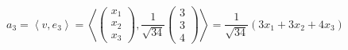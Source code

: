 \begin{ejercicio}
\begin{enumerate}
        \begin{equation*}
            a_3 = \left\langle 
                v, e_3\right\rangle
                = \left\langle 
                \left(\begin{array}{c}
                     x_1 \\ x_2 \\ x_3
                \end{array}\right),
                \frac{1}{\sqrt{34}}
                \left(\begin{array}{c}
                     3 \\ 3 \\ 4
                \end{array}\right)
                \right\rangle
                = \frac{1}{\sqrt{34}}(3x_1+3x_2+4x_3)
        \end{equation*}



\end{enumerate}
\end{ejercicio}
